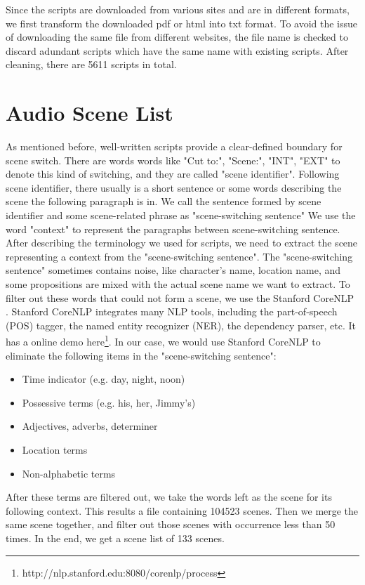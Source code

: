 Since the scripts are downloaded from various sites and are in different formats, we first transform the downloaded pdf or html into txt format. 
To avoid the issue of downloading the same file from different websites, the file name is checked to discard adundant scripts which have the same name with existing scripts. 
After cleaning, there are 5611 scripts in total. 

\section{Audio Scene List}
As mentioned before, well-written scripts provide a clear-defined boundary for scene switch. 
There are words words like "Cut to:", "Scene:", "INT", "EXT" to denote this kind of switching, and they are called "scene identifier".  
Following scene identifier, there usually is a short sentence or some words describing the scene the following paragraph is in. 
We call the sentence formed by scene identifier and some scene-related phrase as "scene-switching sentence"
We use the word "context" to represent the paragraphs between scene-switching sentence. \\ 


After describing the terminology we used for scripts, we need to extract the scene representing a context from the "scene-switching sentence". 
The "scene-switching sentence" sometimes contains noise, like character's name, location name, and some propositions are mixed with the actual scene name we want to extract. 
To filter out these words that could not form a scene, we use the Stanford CoreNLP \cite{manning2014corenlp}. 
Stanford CoreNLP integrates many NLP tools, including the part-of-speech (POS) tagger, the named entity recognizer (NER), the dependency parser, etc. 
It has a online demo here\footnote{http://nlp.stanford.edu:8080/corenlp/process}. 
In our case, we would use Stanford CoreNLP to eliminate the following items in the "scene-switching sentence":
\begin{itemize}
\item Time indicator (e.g. day, night, noon) 
\item Possessive terms (e.g. his, her, Jimmy's)
\item Adjectives, adverbs, determiner 
\item Location terms 
\item Non-alphabetic terms 
\end{itemize}
After these terms are filtered out, we take the words left as the scene for its following context. 
This results a file containing 104523 scenes. 
Then we merge the same scene together, and filter out those scenes with occurrence less than 50 times. 
In the end, we get a scene list of 133 scenes. 

